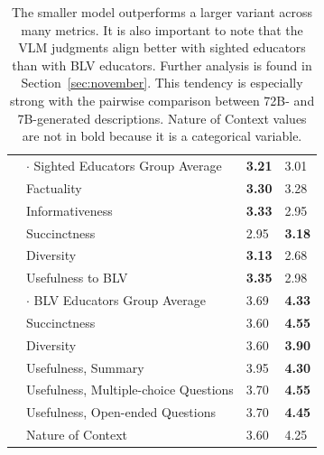 \begin{table}
\begin{tabular}{llll}
        & $\cdot$ Sighted Educators Group Average   & \textbf{3.21} & 3.01 \\
        & Factuality                                & \textbf{3.30} & 3.28 \\
        & Informativeness                           & \textbf{3.33} & 2.95 \\
        & Succinctness                              & 2.95 & \textbf{3.18} \\
        & Diversity                                 & \textbf{3.13} & 2.68 \\
        & Usefulness to  BLV                        & \textbf{3.35} & 2.98 \\

        & $\cdot$ BLV Educators Group Average       & 3.69 & \textbf{4.33} \\
        & Succinctness                              & 3.60 & \textbf{4.55} \\
        & Diversity                                 & 3.60 & \textbf{3.90} \\
        & Usefulness, Summary                       & 3.95 & \textbf{4.30} \\
        & Usefulness, Multiple-choice Questions     & 3.70 & \textbf{4.55} \\
        & Usefulness, Open-ended Questions          & 3.70 & \textbf{4.45} \\
        & Nature of Context                         & 3.60 & 4.25 \\

    \bottomrule
    \end{tabular}
\caption{The smaller model outperforms a larger variant across many metrics. It is also important to note that the VLM judgments align better with sighted educators than with BLV educators. Further analysis is found in Section~\ref{sec:november}. This tendency is especially strong with the pairwise comparison between 72B- and 7B-generated descriptions. Nature of Context values are not in bold because it is a categorical variable.}
\end{table}


